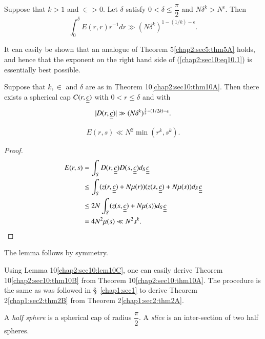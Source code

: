 \begin{theorem}\label{chap2:sec10:thm10A}
Suppose that $k > 1$ and $\in > 0$. Let $\delta$ satisfy $0 < \delta \leq \dfrac{\pi}{2}$ and $N \delta^{k} > N^{\epsilon}$. Then
\begin{equation*}
\int_{0}^{\delta} E(r, r) r^{-1} dr \gg (N \delta^{k})^{1-(1/k)-\epsilon}.\tag{10.1}\label{chap2:sec10:eq10.1}
\end{equation*}
\end{theorem}

It can easily be shown that an analogue of Theorem 5\ref{chap2:sec5:thm5A} holds, and hence that the exponent on the right hand side of (\ref{chap2:sec10:eq10.1}) is essentially best possible.

\begin{theorem}\label{chap2:sec10:thm10B}
Suppose that $k, \in$ and $\delta$ are as in Theorem 10\ref{chap2:sec10:thm10A}. Then there exists a spherical cap $C(r, \underline{\underline{c}})$ with $0 < r \leq \delta$ and with
\begin{equation*}
|D(r, \underline{\underline{c}})| \gg (N \delta^{k})^{\frac{1}{2}-(1/2k)-\epsilon}.
\end{equation*}\pageoriginale
\end{theorem}

\begin{lemma}\label{chap2:sec10:lem10C}
$$
E(r, s) \ll N^{2} \min (r^{k}, s^{k}).
$$
\end{lemma}

\begin{proof}
\begin{align*}
E(r, s) & = \int_{S} D(r, \underline{\underline{c}}) D(s, \underline{\underline{c}}) d_{S} \underline{\underline{c}}\\
& \leq \int_{S} (z(r, \underline{\underline{c}}) + N\mu(r)) (z(s, \underline{\underline{c}}) + N\mu(s)) d_{S}\underline{\underline{c}}\\
& \leq 2N \int_{S} (z(s, \underline{\underline{c}}) + N\mu(s)) d_{S} \underline{\underline{c}}\\
& = 4N^{2} \mu(s) \ll N^{2} s^{k}.
\end{align*}
\end{proof}

The lemma follows by symmetry.

Using Lemma 10\ref{chap2:sec10:lem10C}, one can easily derive Theorem 10\ref{chap2:sec10:thm10B} from Theorem 10\ref{chap2:sec10:thm10A}. The procedure is the same as was followed in \S\ \ref{chap1:sec1} to derive Theorem 2\ref{chap1:sec2:thm2B} from Theorem 2\ref{chap1:sec2:thm2A}.

A {\em half sphere} is a spherical cap of radius $\dfrac{\pi}{2}$. A {\em slice} is an inter-section of two half spheres.

